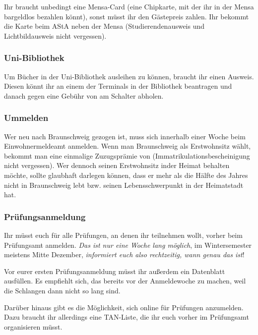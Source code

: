 Ihr braucht unbedingt eine Mensa-Card (eine Chipkarte,
mit der ihr in der Mensa bargeldlos bezahlen k\"onnt), sonst
m\"usst ihr den G\"astepreis zahlen. Ihr bekommt die Karte beim
AStA neben der Mensa (Studierendenausweis und Lichtbildausweis
nicht vergessen).

\subsubsection{Uni-Bibliothek}

Um B\"ucher in der Uni-Bibliothek ausleihen zu k\"onnen, braucht ihr
einen Ausweis. Diesen k\"onnt ihr an einem der Terminals in der
Bibliothek beantragen und danach gegen eine Geb\"uhr von \unit[5]{\EUR}{}
am Schalter abholen.

\subsubsection{Ummelden}

Wer neu nach Braunschweig gezogen ist, muss sich innerhalb einer
Woche beim Einwohnermeldeamt anmelden. Wenn man Braunschweig als
Erstwohnsitz w\"ahlt, bekommt man eine einmalige Zuzugspr\"amie von
\unit[200]{\EUR}{} (Immatrikulationsbescheinigung nicht vergessen). Wer
dennoch seinen Erstwohnsitz inder Heimat behalten m\"ochte, sollte
glaubhaft darlegen k\"onnen, dass er mehr als die H\"alfte des Jahres
nicht in Braunschweig lebt bzw. seinen Lebensschwerpunkt in der
Heimatstadt hat.

\subsubsection{Pr\"ufungsanmeldung}

Ihr m\"usst euch f\"ur alle Pr\"ufungen, an denen ihr teilnehmen
wollt, vorher beim Pr\"ufungsamt anmelden. \emph{Das ist nur eine
Woche lang m\"oglich}, im Wintersemester meistens Mitte Dezember,
\emph{informiert euch also rechtzeitig, wann genau das ist}!

Vor eurer ersten Pr\"ufungsanmeldung m\"usst ihr au\ss erdem ein
Datenblatt ausf\"ullen. Es empfiehlt sich, das bereits vor der
Anmeldewoche zu machen, weil die Schlangen dann nicht so lang sind.

Dar\"uber hinaus gibt es die M\"oglichkeit, sich online f\"ur
Pr\"ufungen anzumelden. Dazu braucht ihr allerdings eine TAN-Liste,
die ihr euch vorher im Pr\"ufungsamt organisieren m\"usst.

